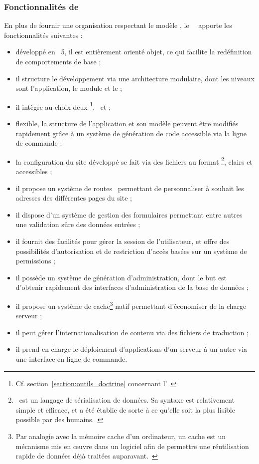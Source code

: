 \subsubsection{Fonctionnalités de \asf}

En plus de fournir une organisation respectant le modèle \amvc, le \afm\ \asf\ apporte les fonctionnalités suivantes :

\begin{itemize}
	\item développé en \aphp~5, il est entièrement orienté objet, ce qui facilite la redéfinition de comportements de base ;
	\item il structure le développement via une architecture modulaire, dont les niveaux sont l'application, le module et le \aplugin ;
	\item il intègre au choix deux \aorms\footnote{Cf. section~\ref{section:outils_doctrine} concernant l'\aorm\ \adoctrine}, \adoctrine\ et \apropel ;
	\item flexible, la structure de l'application et son modèle peuvent être modifiés rapidement grâce à un système de génération de code accessible via la ligne de commande ;
	\item la configuration du site développé se fait via des fichiers au format \ayml\footnote{\ayml\ est un langage de sérialisation de données. Sa syntaxe est relativement simple et efficace, et a été établie de sorte à ce qu'elle soit la plus lisible possible par des humains.~\cite{yml}}, clairs et accessibles ;
	\item il propose un système de \og routes \fg\ permettant de personnaliser à souhait les adresses des différentes pages du site ;
	\item il dispose d'un système de gestion des formulaires permettant entre autres une validation sûre des données entrées ;
	\item il fournit des facilités pour gérer la session de l'utilisateur, et offre des possibilités d'autorisation et de restriction d'accès basées sur un système de permissions ;
	\item il possède un système de génération d'administration, dont le but est d'obtenir rapidement des interfaces d'administration de la base de don\-nées ;
	\item il propose un système de cache\footnote{Par analogie avec la mémoire cache d'un ordinateur, un cache est un mécanisme mis en œuvre dans un logiciel afin de permettre une réutilisation rapide de données déjà traitées auparavant.~\cite{cache}} natif permettant d'économiser de la charge serveur ;
	\item il peut gérer l'internationalisation de contenu via des fichiers de traduction ;
	\item il prend en charge le déploiement d'applications d'un serveur à un autre via une interface en ligne de commande.
\end{itemize}
